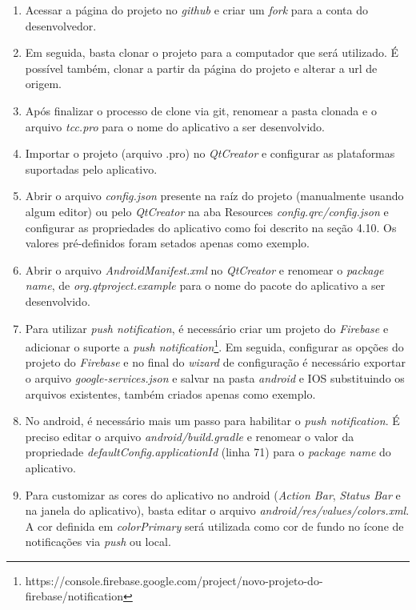 \begin{enumerate}
	\item Acessar a página do projeto no \textit{github} e criar um \textit{fork} para a conta do desenvolvedor.

	\item Em seguida, basta clonar o projeto para a computador que será utilizado. É possível também, clonar a partir da página do projeto e alterar a url de origem.

	\item Após finalizar o processo de clone via git, renomear a pasta clonada e o arquivo \textit{tcc.pro} para o nome do aplicativo a ser desenvolvido.

	\item Importar o projeto (arquivo .pro) no \textit{QtCreator} e configurar as plataformas suportadas pelo aplicativo.

	\item Abrir o arquivo \textit{config.json} presente na raíz do projeto (manualmente usando algum editor) ou pelo \textit{QtCreator} na aba Resources \textit{config.qrc/config.json} e configurar as propriedades do aplicativo como foi descrito na seção 4.10. Os valores pré-definidos foram setados apenas como exemplo.

	\item Abrir o arquivo \textit{AndroidManifest.xml} no \textit{QtCreator} e renomear o \textit{package name}, de \textit{org.qtproject.example} para o nome do pacote do aplicativo a ser desenvolvido.

	\item Para utilizar \textit{push notification}, é necessário criar um projeto do \textit{Firebase} e adicionar o suporte a \textit{push notification}\footnote{https://console.firebase.google.com/project/novo-projeto-do-firebase/notification}. Em seguida, configurar as opções do projeto do \textit{Firebase} e no final do \textit{wizard} de configuração é necessário exportar o arquivo \textit{google-services.json} e salvar na pasta \textit{android} e IOS substituindo os arquivos existentes, também criados apenas como exemplo.

	\item No android, é necessário mais um passo para habilitar o \textit{push notification}. É preciso editar o arquivo \textit{android/build.gradle} e renomear o valor da propriedade \textit{defaultConfig.applicationId} (linha 71) para o \textit{package name} do aplicativo.

	\item Para customizar as cores do aplicativo no android (\textit{Action Bar}, \textit{Status Bar} e na janela do aplicativo), basta editar o arquivo \textit{android/res/values/colors.xml}. A cor definida em \textit{colorPrimary} será utilizada como cor de fundo no ícone de notificações via \textit{push} ou local.


\end{enumerate}
